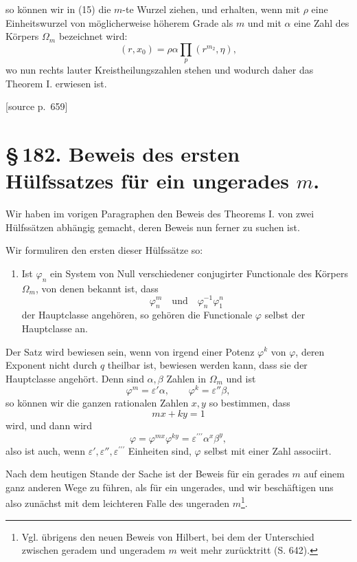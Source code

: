 \documentclass[11pt]{article}
\newcommand{\srcpage}[1]{\par\medskip\noindent\textsf{[source p.~#1]}\par\smallskip}
\begin{document}
so können wir in (15) die $m$-te Wurzel ziehen, und erhalten, wenn mit $\rho$ eine Einheitswurzel von möglicherweise höherem Grade als $m$ und mit $\alpha$ eine Zahl des Körpers $\Omega_m$ bezeichnet wird:
\begin{equation}
  (r,x_0)=\rho\alpha\prod_p(r^{m_2},\eta),
\tag{16}
\end{equation}
wo nun rechts lauter Kreistheilungszahlen stehen und wodurch daher das Theorem I. erwiesen ist.

\srcpage{659}
\section*{\S\,182. Beweis des ersten Hülfssatzes für ein ungerades $m$.}

Wir haben im vorigen Paragraphen den Beweis des Theorems I. von zwei Hülfssätzen abhängig gemacht, deren Beweis nun ferner zu suchen ist.

Wir formuliren den ersten dieser Hülfssätze so:

\begin{enumerate}[label=\alph*),leftmargin=2.2em]
\item Ist $\varphi_n$ ein System von Null verschiedener conjugirter Functionale des Körpers $\Omega_m$, von denen bekannt ist, dass
\[
\varphi_n^m\quad\text{und}\quad\varphi_n^{-1}\varphi_1^n
\]
der Hauptclasse angehören, so gehören die Functionale $\varphi$ selbst der Hauptclasse an.
\end{enumerate}

Der Satz wird bewiesen sein, wenn von irgend einer Potenz $\varphi^k$ von $\varphi$, deren Exponent nicht durch $q$ theilbar ist, bewiesen werden kann, dass sie der Hauptclasse angehört. Denn sind $\alpha,\beta$ Zahlen in $\Omega_m$ und ist
\[
\varphi^m=\varepsilon'\alpha,
\qquad
\varphi^k=\varepsilon''\beta,
\]
so können wir die ganzen rationalen Zahlen $x,y$ so bestimmen, dass
\[
mx+ky=1
\]
wird, und dann wird
\[
\varphi=\varphi^{mx}\varphi^{ky}=\varepsilon^{\prime\prime\prime}\alpha^x\beta^y,
\]
also ist auch, wenn $\varepsilon',\varepsilon'',\varepsilon^{\prime\prime\prime}$ Einheiten sind, $\varphi$ selbst mit einer Zahl associirt.

Nach dem heutigen Stande der Sache ist der Beweis für ein gerades $m$ auf einem ganz anderen Wege zu führen, als für ein ungerades, und wir beschäftigen uns also zunächst mit dem leichteren Falle des ungeraden $m$\footnote{Vgl. übrigens den neuen Beweis von Hilbert, bei dem der Unterschied zwischen geradem und ungeradem $m$ weit mehr zurücktritt (S. 642).}.
\end{document}
